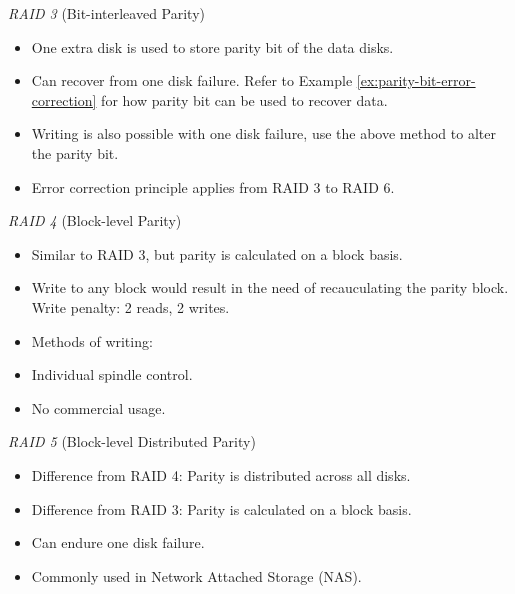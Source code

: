 \emph{RAID 3} {\normalfont\large (Bit-interleaved Parity)}


\begin{itemize}
    \item One extra disk is used to store parity bit of the data disks.
    \item Can recover from one disk failure. Refer to Example \ref{ex:parity-bit-error-correction}
        for how parity bit can be used to recover data.
    \item Writing is also possible with one disk failure, use the above method to alter the
        parity bit.
    \item Error correction principle applies from RAID 3 to RAID 6.
\end{itemize}

\emph{RAID 4} {\normalfont\large (Block-level Parity)}

\begin{itemize}
    \item Similar to RAID 3, but parity is calculated on a block basis.
    \item Write to any block would result in the need of recauculating the parity block.
        Write penalty: 2 reads, 2 writes.
    \item Methods of writing: 
    \item Individual spindle control.
    \item No commercial usage.
\end{itemize}

\emph{RAID 5} {\normalfont\large (Block-level Distributed Parity)}

\begin{itemize}
    \item Difference from RAID 4: Parity is distributed across all disks.
    \item Difference from RAID 3: Parity is calculated on a block basis.
    \item Can endure one disk failure.
    \item Commonly used in Network Attached Storage (NAS).
\end{itemize}

